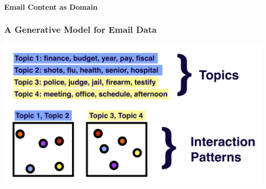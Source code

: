 \documentclass[xcolor={table}, fleqn]{beamer}
\newenvironment{changemargin}[2]{%
  \begin{list}{}{%
    \setlength{\topsep}{0pt}%
    \setlength{\leftmargin}{#1}%
    \setlength{\rightmargin}{#2}%
    \setlength{\listparindent}{\parindent}%
    \setlength{\itemindent}{\parindent}%
    \setlength{\parsep}{\parskip}%
  }%
  \item[]}{\end{list}}
\begin{document}
\begin{frame}\frametitle{}
	\begin{center}
		\Huge\textbf{Email Content as Domain}
	\end{center}
\end{frame}


\begin{frame}\frametitle{A Generative Model for Email Data}
	\begin{changemargin}{-1cm}{ -1cm}
    \centering
	\includegraphics[width=1.15\textwidth]{images/Gen_Proc_1.png}
	\end{changemargin} 
\end{frame}


%
\end{document}
